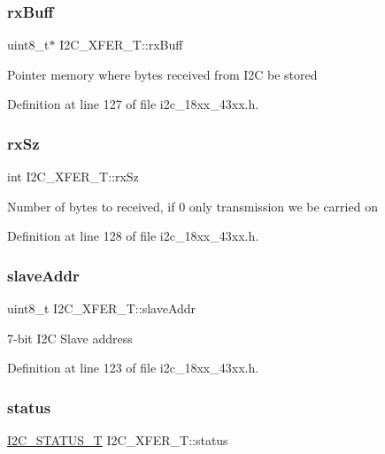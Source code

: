 \subsubsection{\texorpdfstring{rx\+Buff}{rxBuff}}
{\footnotesize\ttfamily uint8\+\_\+t$\ast$ I2\+C\+\_\+\+X\+F\+E\+R\+\_\+\+T\+::rx\+Buff}

Pointer memory where bytes received from I2C be stored 

Definition at line 127 of file i2c\+\_\+18xx\+\_\+43xx.\+h.

\mbox{\label{struct_i2_c___x_f_e_r___t_a8c5b062847cfd0fe9b27058743de8aa5}} 
\subsubsection{\texorpdfstring{rx\+Sz}{rxSz}}
{\footnotesize\ttfamily int I2\+C\+\_\+\+X\+F\+E\+R\+\_\+\+T\+::rx\+Sz}

Number of bytes to received, if 0 only transmission we be carried on 

Definition at line 128 of file i2c\+\_\+18xx\+\_\+43xx.\+h.

\mbox{\label{struct_i2_c___x_f_e_r___t_a39393422071ba7bca5d22e15b110e723}} 
\subsubsection{\texorpdfstring{slave\+Addr}{slaveAddr}}
{\footnotesize\ttfamily uint8\+\_\+t I2\+C\+\_\+\+X\+F\+E\+R\+\_\+\+T\+::slave\+Addr}

7-\/bit I2C Slave address 

Definition at line 123 of file i2c\+\_\+18xx\+\_\+43xx.\+h.

\mbox{\label{struct_i2_c___x_f_e_r___t_aefc3cfe9bf7cdaeb2a632c42250602ad}} 
\subsubsection{\texorpdfstring{status}{status}}
{\footnotesize\ttfamily \hyperlink{group___i2_c__18_x_x__43_x_x_ga21aa839302786105dcf6a96be0e6e8bc}{I2\+C\+\_\+\+S\+T\+A\+T\+U\+S\+\_\+T} I2\+C\+\_\+\+X\+F\+E\+R\+\_\+\+T\+::status}

